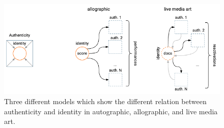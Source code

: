 \begin{figure}[!h]
    \centering
    \includegraphics[width=\linewidth]{chapters/2-new_conservation_paradigms/image/graph02-identity.png}
    \caption{Three different models which show the different relation between authenticity and identity in autographic, allographic, and live media art.}
    \label{fig:c2-authenticity}
\end{figure}

